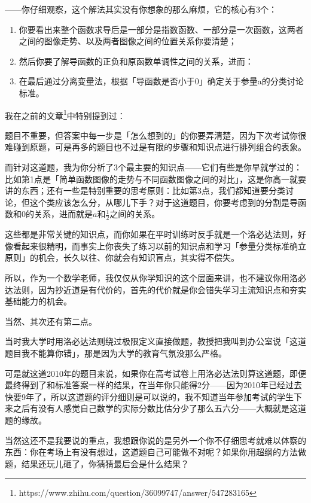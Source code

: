 ——你仔细观察，这个解法其实没有你想象的那么麻烦，它的核心有3个：
\begin{enumerate}
\item 你要看出来整个函数求导后是一部分是指数函数、一部分是一次函数，这两者之间的图像走势、以及两者图像之间的位置关系你要清楚；

\item 然后你要了解导函数的正负和原函数单调性之间的关系，进而：

\item 在最后通过分离变量法，根据「导函数是否小于0」确定关于参量a的分类讨论标准。
\end{enumerate}

我在之前的文章\footnote{https://www.zhihu.com/question/36099747/answer/547283165}中特别提到过：

题目不重要，但答案中每一步是「怎么想到的」的你要弄清楚，因为下次考试你很难碰到原题，可是再多的题目也不过是有限的步骤和知识点进行排列组合的表象。

而针对这道题，我为你分析了3个最主要的知识点——它们有些是你早就学过的：比如第1点是「简单函数图像的走势与不同函数图像之间的对比」，这是你高一就要讲的东西；还有一些是特别重要的思考原则：比如第3点，我们都知道要分类讨论，但这个类应该怎么分，从哪儿下手？对于这道题目，你要考虑到的分割是导函数和0的关系，进而就是$a$和$\frac12$之间的关系。

这些都是非常关键的知识点，而你如果在平时训练时反手就是一个洛必达法则，好像看起来很精明，而事实上你丧失了练习以前的知识点和学习「参量分类标准确立原则」的机会，长久以往、你就会有知识盲点，其实得不偿失。

所以，作为一个数学老师，我仅仅从你学知识的这个层面来讲，也不建议你用洛必达法则，因为抄近道是有代价的，首先的代价就是你会错失学习主流知识点和夯实基础能力的机会。

当然、其次还有第二点。


当时我大学时用洛必达法则绕过极限定义直接做题，教授把我叫到办公室说「这道题目我不能算你错」，那是因为大学的教育气氛没那么严格。

可是就这道2010年的题目来说，如果你在高考试卷上用洛必达法则算这道题，即便最终得到了和标准答案一样的结果，在当年你只能得2分——因为2010年已经过去快要9年了，所以这道题的评分细则是可以说的，我不知道当年参加考试的学生下来之后有没有人感觉自己数学的实际分数比估分少了那么五六分——大概就是这道题的缘故。

当然这还不是我要说的重点，我想跟你说的是另外一个你不仔细思考就难以体察的东西：你在考场上有没有想过，这道题自己可能做不对呢？如果你用超纲的方法做题，结果还玩儿砸了，你猜猜最后会是什么结果？

